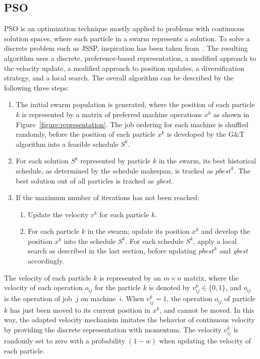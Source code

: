 \documentclass[paper=a4, fontsize=9pt]{scrartcl}
\begin{document}
\begin{multicols}{2}
\section*{\acl{PSO}}

\acf{PSO} is an optimization technique mostly applied to problems with continuous solution spaces, where each particle in a swarm represents a solution. To solve a discrete problem such as \ac{JSSP}, inspiration has been taken from~\cite{sha2006hybrid}. The resulting algorithm uses a discrete, preference-based representation, a modified approach to the velocity update, a modified approach to position updates, a diversification strategy, and a local search. The overall algorithm can be described by the following three steps:

\begin{enumerate}
    \item The initial swarm population is generated, where the position of each particle $k$ is represented by a matrix of preferred machine operations $x^k$ as shown in Figure~\ref{figure:representation}. The job ordering for each machine is shuffled randomly, before the position of each particle $x^k$ is developed by the G\&T algorithm into a feasible schedule $S^k$.
    \item For each solution $S^k$ represented by particle $k$ in the swarm, its best historical schedule, as determined by the schedule makespan, is tracked as $\textit{pbest}^k$. The best solution out of all particles is tracked as \textit{gbest}.
    \item If the maximum number of iterations has not been reached:
    \begin{enumerate}
        \item Update the velocity $v^k$ for each particle $k$.
        \item For each particle $k$ in the swarm; update its position $x^k$ and develop the position $x^k$ into the schedule $S^k$. For each schedule $S^k$, apply a local search as described in the last section, before updating $\textit{pbest}^k$ and \textit{gbest} accordingly.
    \end{enumerate}
\end{enumerate}

The velocity of each particle $k$ is represented by an $m \times n$ matrix, where the velocity of each operation $o_{ij}$ for the particle $k$ is denoted by $v_{ij}^k \in \{0,1\}$, and $o_{ij}$ is the operation of job~$j$ on machine~$i$. When $v_{ij}^k = 1$, the operation $o_{ij}$ of particle $k$ has just been moved to its current position in $x^k$, and cannot be moved. In this way, the adapted velocity mechanism imitates the behavior of continuous velocity by providing the discrete representation with momentum. The velocity $v_{ij}^k$ is randomly set to zero with a probability $(1-w)$ when updating the velocity of each particle.


\end{multicols}
\end{document}
